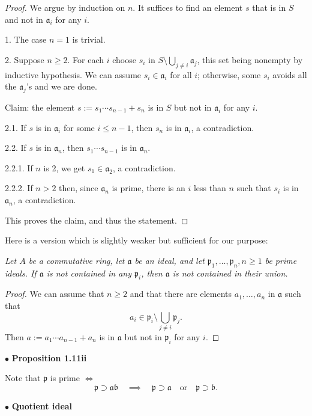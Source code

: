 \documentclass[parskip=half,fontsize=12pt]{scrartcl}%
\newcommand{\mf}{\mathfrak}
\newcommand{\aaa}{\mf a}
\newcommand{\bbb}{\mf b}
\newcommand{\ppp}{\mf p}
\newcommand{\bu}{\bullet}
\begin{document}
\begin{proof} 
We argue by induction on $n$. It suffices to find an element $s$ that is in $S$ and not in $\aaa_i$ for any $i$. 

1. The case $n=1$ is trivial. 

2. Suppose $n\ge2$. For each $i$ choose $s_i$ in $S\setminus\bigcup_{j \ne i}\aaa_j$, this set being nonempty by inductive hypothesis. We can assume $s_i \in \aaa_i$ for all $i$; otherwise, some $s_i$ avoids all the $\aaa_j$'s and we are done. 

Claim: the element $s:=s_1\cdots s_{n-1}+s_n$ is in $S$ but not in $\aaa_i$ for any $i$. 

2.1. If $s$ is in $\aaa_i$ for some $i\le n-1$, then $s_n$ is in $\aaa_i$, a contradiction. 

2.2. If $s$ is in $\aaa_n$, then $s_1\cdots s_{n-1}$ is in $\aaa_n$. 

2.2.1. If $n$ is 2, we get $s_1\in \aaa_2$, a contradiction.

2.2.2. If $n>2$ then, since $\aaa_n$ is prime, there is an $i$ less than $n$ such that $s_i$ is in $\aaa_n$, a contradiction.

This proves the claim, and thus the statement. 
\end{proof}

Here is a version which is slightly weaker but sufficient for our purpose:

\emph{Let $A$ be a commutative ring, let $\aaa$ be an ideal, and let $\ppp_1,\dots,\ppp_n,n\ge1$ be prime ideals. If $\mf a$ is not contained in any $\ppp_i$, then $\mf a$ is not contained in their union.}

\begin{proof} 
We can assume that $n\ge2$ and that there are elements $a_1,\dots,a_n$ in $\mf a$ such that 
$$
a_i\in\ppp_i\setminus\bigcup_{j \ne i}\ppp_j.
$$ 
Then $a:=a_1\cdots a_{n-1}+a_n$ is in $\mf a$ but not in $\ppp_i$ for any $i$.
\end{proof}


$\bu$ \textbf{Proposition 1.11ii}%

Note that $\ppp$ is prime $\iff$
$$
\ppp\supset\mf a\bbb\quad\implies\quad\ppp\supset\mf a\quad\text{or}\quad\ppp\supset\bbb.
$$

$\bu$ \textbf{Quotient ideal}%
\end{document}
